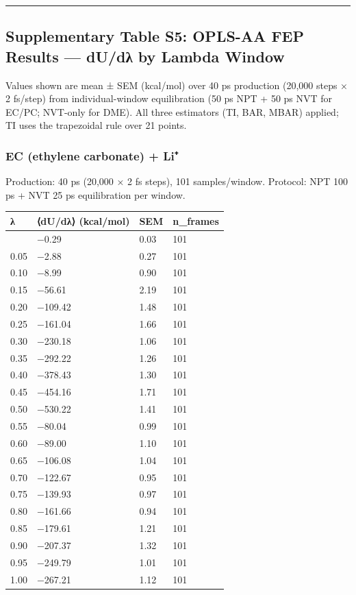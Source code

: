 \documentclass[
  11pt,
]{article}
\newcounter{none} %
\begin{document}
\begin{center}\rule{0.5\linewidth}{0.5pt}\end{center}

\subsection{Supplementary Table S5: OPLS-AA FEP Results --- dU/dλ by
Lambda
Window}\label{supplementary-table-s5-opls-aa-fep-results-dudux3bb-by-lambda-window}

Values shown are mean ± SEM (kcal/mol) over 40 ps production (20,000
steps × 2 fs/step) from individual-window equilibration (50 ps NPT + 50
ps NVT for EC/PC; NVT-only for DME). All three estimators (TI, BAR,
MBAR) applied; TI uses the trapezoidal rule over 21 points.

\subsubsection{EC (ethylene carbonate) +
Li⁺}\label{ec-ethylene-carbonate-li}

Production: 40 ps (20,000 × 2 fs steps), 101 samples/window. Protocol:
NPT 100 ps + NVT 25 ps equilibration per window.

{\def\LTcaptype{none} %
\begin{longtable}[]{@{}llll@{}}
\toprule\noalign{}
λ & ⟨dU/dλ⟩ (kcal/mol) & SEM & n\_frames \\
\midrule\noalign{}
\endhead
\bottomrule\noalign{}
\endlastfoot
0.00 & −0.29 & 0.03 & 101 \\
0.05 & −2.88 & 0.27 & 101 \\
0.10 & −8.99 & 0.90 & 101 \\
0.15 & −56.61 & 2.19 & 101 \\
0.20 & −109.42 & 1.48 & 101 \\
0.25 & −161.04 & 1.66 & 101 \\
0.30 & −230.18 & 1.06 & 101 \\
0.35 & −292.22 & 1.26 & 101 \\
0.40 & −378.43 & 1.30 & 101 \\
0.45 & −454.16 & 1.71 & 101 \\
0.50 & −530.22 & 1.41 & 101 \\
0.55 & −80.04 & 0.99 & 101 \\
0.60 & −89.00 & 1.10 & 101 \\
0.65 & −106.08 & 1.04 & 101 \\
0.70 & −122.67 & 0.95 & 101 \\
0.75 & −139.93 & 0.97 & 101 \\
0.80 & −161.66 & 0.94 & 101 \\
0.85 & −179.61 & 1.21 & 101 \\
0.90 & −207.37 & 1.32 & 101 \\
0.95 & −249.79 & 1.01 & 101 \\
1.00 & −267.21 & 1.12 & 101 \\
\end{longtable}
}
\end{document}
